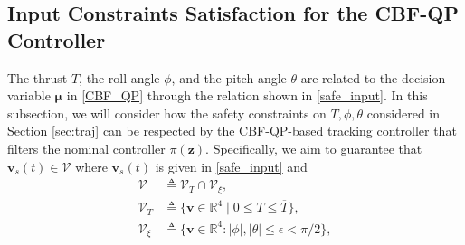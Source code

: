 \documentclass[journal,10pt]{IEEEtran}
\newcommand{\vect}[1]{\boldsymbol{\mathbf{#1}}}
\newif\ifdraft
\newcommand{\XX}[1]{\ifdraft{\color{red}[{\bf XX}: #1]}\fi}
\newcommand{\VF}[1]{\ifdraft{\color{blue}[{\bf VF}: #1]}\fi}
\begin{document}

\subsection{Input Constraints Satisfaction for the CBF-QP Controller}
The thrust $T$, the roll angle $\phi$, and the pitch angle $\theta$ are related to the decision variable $\vect{\mu}$
in \eqref{CBF_QP} through the relation shown in \eqref{safe_input}. In this subsection, we will consider how the safety constraints on $T,\phi,\theta$ considered in Section \ref{sec:traj} can be respected by the CBF-QP-based tracking controller that filters the nominal controller $\pi(\vect{z})$.
Specifically,  we aim to guarantee that $\vect{v}_s(t)\in\mathcal{V}$ where $\vect{v}_s(t)$ is given in \eqref{safe_input} and%
\begin{subequations}
\begin{align}
    \mathcal{V}&\triangleq \mathcal{V}_{T}\cap \mathcal{V}_{\xi}, \label{eqV}\\
 \mathcal{V}_{T} &\triangleq  \{\vect{v}\in\mathbb{R}^4\mid 0\leq T\leq \overline{T}\},\\
    \mathcal{V}_{\xi}&\triangleq \{\vect{v}\in\mathbb{R}^4: |\phi|,|\theta|\leq \epsilon<\pi/2\},
\end{align}
\end{subequations}
\end{document}

